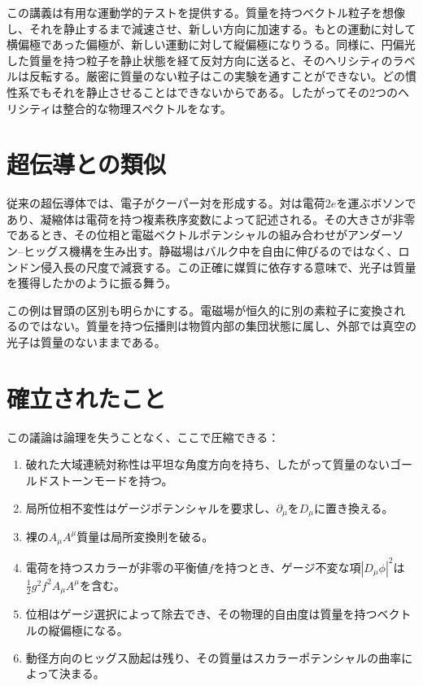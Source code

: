 \begin{classroomqa}
\end{classroomqa}

この講義は有用な運動学的テストを提供する。質量を持つベクトル粒子を想像し、それを静止するまで減速させ、新しい方向に加速する。もとの運動に対して横偏極であった偏極が、新しい運動に対して縦偏極になりうる。同様に、円偏光した質量を持つ粒子を静止状態を経て反対方向に送ると、そのヘリシティのラベルは反転する。厳密に質量のない粒子はこの実験を通すことができない。どの慣性系でもそれを静止させることはできないからである。したがってその2つのヘリシティは整合的な物理スペクトルをなす。

\section{超伝導との類似}

従来の超伝導体では、電子がクーパー対を形成する。対は電荷\(2e\)を運ぶボソンであり、凝縮体は電荷を持つ複素秩序変数によって記述される。その大きさが非零であるとき、その位相と電磁ベクトルポテンシャルの組み合わせがアンダーソン--ヒッグス機構を生み出す。静磁場はバルク中を自由に伸びるのではなく、ロンドン侵入長の尺度で減衰する。この正確に媒質に依存する意味で、光子は質量を獲得したかのように振る舞う。

この例は冒頭の区別も明らかにする。電磁場が恒久的に別の素粒子に変換されるのではない。質量を持つ伝播則は物質内部の集団状態に属し、外部では真空の光子は質量のないままである。

\section{確立されたこと}

この議論は論理を失うことなく、ここで圧縮できる：
\begin{enumerate}
  \item 破れた大域連続対称性は平坦な角度方向を持ち、したがって質量のないゴールドストーンモードを持つ。
  \item 局所位相不変性はゲージポテンシャルを要求し、\(\partial_\mu\)を\(D_\mu\)に置き換える。
  \item 裸の\(A_\mu A^\mu\)質量は局所変換則を破る。
  \item 電荷を持つスカラーが非零の平衡値\(f\)を持つとき、ゲージ不変な項\(|D_\mu\phi|^2\)は\(\frac12g^2f^2A_\mu A^\mu\)を含む。
  \item 位相はゲージ選択によって除去でき、その物理的自由度は質量を持つベクトルの縦偏極になる。
  \item 動径方向のヒッグス励起は残り、その質量はスカラーポテンシャルの曲率によって決まる。
\end{enumerate}

